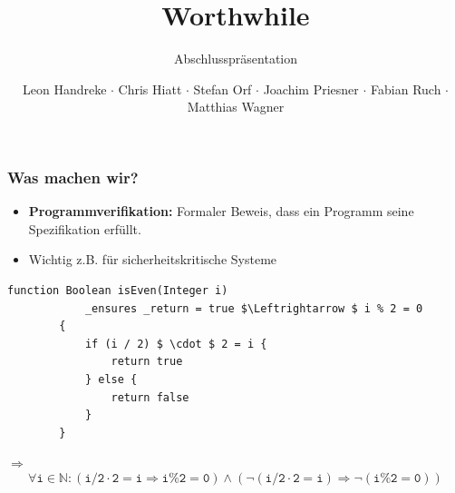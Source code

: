 \documentclass[t,svgnames]{beamer}
\title{Worthwhile}
\subtitle{Abschlusspräsentation}
\author{Leon Handreke $\cdot$ Chris Hiatt $\cdot$ Stefan Orf $\cdot$ Joachim Priesner $\cdot$ Fabian Ruch $\cdot$ Matthias Wagner}
\institute[ITI]{Institut für Theoretische Informatik}
\begin{document}
\begin{frame}
\maketitle
\end{frame}

\begin{frame}[fragile]
	\frametitle{Was machen wir?}
	
	\begin{itemize}
		\item \textbf{Programmverifikation:} Formaler Beweis, dass ein Programm seine Spezifikation erfüllt.
		\item Wichtig z.B. für sicherheitskritische Systeme
	\end{itemize}
	
		
	\begin{lstlisting}[frame=lines,mathescape=true]
		function Boolean isEven(Integer i)
		    _ensures _return = true $\Leftrightarrow $ i % 2 = 0
		{
		    if (i / 2) $ \cdot $ 2 = i {
		        return true
		    } else {
		        return false
		    }
		}
	\end{lstlisting}
	
	\begin{center}$\Rightarrow$ $$\mathtt{\forall i \in \mathbb{N} : (i / 2 \cdot 2 = i \Rightarrow i \% 2 = 0) \wedge (\neg(i / 2 \cdot 2 = i) \Rightarrow \neg(i \% 2 = 0))}$$\end{center}
	
\end{frame}
\end{document}

